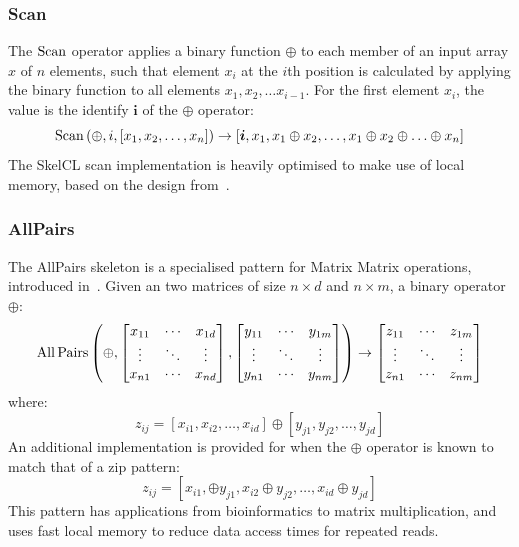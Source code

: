 \subsubsection{Scan}

The $\operatorname*{Scan}$ operator applies a binary function $\oplus$ to each member
of an input array $x$ of $n$ elements, such that element $x_i$ at the
$i$th position is calculated by applying the binary function to all
elements $x_1,x_2, \ldots x_{i-1}$. For the first element $x_i$, the
value is the identify $\bm{i}$ of the $\oplus$ operator:
%
\begin{equation}
  \operatorname*{Scan} \left( \oplus, i, [x_1,x_2,\ldots,x_n] \right)
  \to
  \left[ \bm{i}, x_1, x_1 \oplus x_2, \ldots, x_1 \oplus x_2 \oplus \ldots \oplus x_n \right]
\end{equation}
%
The SkelCL scan implementation is heavily optimised to make use of
local memory, based on the design from~\cite{Harris2007a}.


\subsubsection{AllPairs}

The AllPairs skeleton is a specialised pattern for Matrix Matrix
operations, introduced in~\cite{Steuwer2014}. Given an two matrices of
size $n \times d$ and $n \times m$, a binary operator $\oplus$:
%
\begin{equation}
\operatorname*{All\,Pairs} \left( \oplus,
\begin{bmatrix}
  x_{11} & \cdots & x_{1d} \\
  \vdots & \ddots & \vdots \\
  x_{n1} & \cdots & x_{nd}
\end{bmatrix},
\begin{bmatrix}
  y_{11} & \cdots & y_{1m} \\
  \vdots & \ddots & \vdots \\
  y_{n1} & \cdots & y_{nm}
\end{bmatrix} \right)
\to
\begin{bmatrix}
  z_{11} & \cdots & z_{1m} \\
  \vdots & \ddots & \vdots \\
  z_{n1} & \cdots & z_{nm}
\end{bmatrix}
\end{equation}
%
where:
%
\begin{equation}
z_{ij} =
\left[ x_{i1}, x_{i2}, \ldots, x_{id} \right] \oplus
\left[ y_{j1}, y_{j2}, \ldots, y_{jd} \right]
\end{equation}
%
An additional implementation is provided for when the $\oplus$
operator is known to match that of a zip pattern:
%
\begin{equation}
z_{ij} =
\left[
  x_{i1}, \oplus y_{j1}, x_{i2} \oplus y_{j2}, \ldots, x_{id} \oplus y_{jd}
\right]
\end{equation}
%
This pattern has applications from bioinformatics to matrix
multiplication, and uses fast local memory to reduce data access times
for repeated reads.


